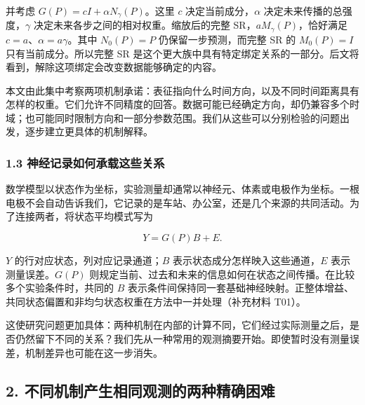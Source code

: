 \documentclass[11pt,a4paper]{article}
\begin{document}
并考虑 \(G(P)=cI+\alpha N_\gamma(P)\)。这里 \(c\)
决定当前成分，\(\alpha\) 决定未来传播的总强度，\(\gamma\)
决定未来各步之间的相对权重。缩放后的完整 SR，\(aM_\gamma(P)\)，恰好满足
\(c=a\)、\(\alpha=a\gamma\)。其中 \(N_0(P)=P\) 仍保留一步预测，而完整 SR
的 \(M_0(P)=I\) 只有当前成分。所以完整 SR
是这个更大族中具有特定绑定关系的一部分。后文将看到，解除这项绑定会改变数据能够确定的内容。

本文由此集中考察两项机制承诺：表征指向什么时间方向，以及不同时间距离具有怎样的权重。它们允许不同精度的回答。数据可能已经确定方向，却仍兼容多个时域；也可能同时限制方向和一部分参数范围。我们从这些可以分别检验的问题出发，逐步建立更具体的机制解释。

\subsubsection{1.3
神经记录如何承载这些关系}\label{ux795eux7ecfux8bb0ux5f55ux5982ux4f55ux627fux8f7dux8fd9ux4e9bux5173ux7cfb}

\par
\noindent\begin{minipage}{\linewidth}

数学模型以状态作为坐标，实验测量却通常以神经元、体素或电极作为坐标。一根电极不会自动告诉我们，它记录的是车站、办公室，还是几个来源的共同活动。为了连接两者，将状态平均模式写为

\[
Y=G(P)B+E.
\]

\end{minipage}\par

\(Y\) 的行对应状态，列对应记录通道；\(B\)
表示状态成分怎样映入这些通道，\(E\) 表示测量误差。\(G(P)\)
则规定当前、过去和未来的信息如何在状态之间传播。在比较多个实验条件时，共同的
\(B\)
表示条件间保持同一套基础神经映射。正整体增益、共同状态偏置和非均匀状态权重在方法中一并处理（补充材料
T01）。

这使研究问题更加具体：两种机制在内部的计算不同，它们经过实际测量之后，是否仍然留下不同的关系？我们先从一种常用的观测摘要开始。即使暂时没有测量误差，机制差异也可能在这一步消失。

\subsection{2.
不同机制产生相同观测的两种精确困难}\label{ux4e0dux540cux673aux5236ux4ea7ux751fux76f8ux540cux89c2ux6d4bux7684ux4e24ux79cdux7cbeux786eux56f0ux96be}

\end{document}
